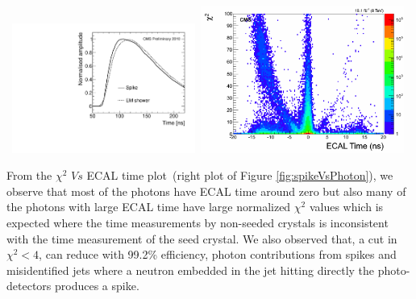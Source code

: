  \vspace{5mm}
\begin{minipage}{0.90\linewidth} 
\begin{center}
\mbox{
\includegraphics[height=.450\textwidth, width=0.45\textwidth]{THESISPLOTS/spike_pulse_shape.pdf}
\includegraphics[height=.450\textwidth, width=0.5\textwidth]{THESISPLOTS/seedTime_Chi2.png} }
\label{fig:spikeVsPhoton}
\end{center}
\end{minipage}

 \vspace{5mm}
From the $\chi^{2}$ $Vs$ ECAL time plot~(right plot of Figure \ref{fig:spikeVsPhoton}), we observe that  most of the photons have ECAL time around zero but also many of the photons with large ECAL time  have large normalized $\chi^{2}$ values which is expected where the time measurements by non-seeded crystals is inconsistent with the time measurement of the seed crystal. We also observed that, a cut in $\chi^{2} < 4$, can reduce with 99.2\% efficiency, photon contributions from spikes and misidentified jets where a neutron embedded in the jet hitting directly the photo-detectors produces a spike.
